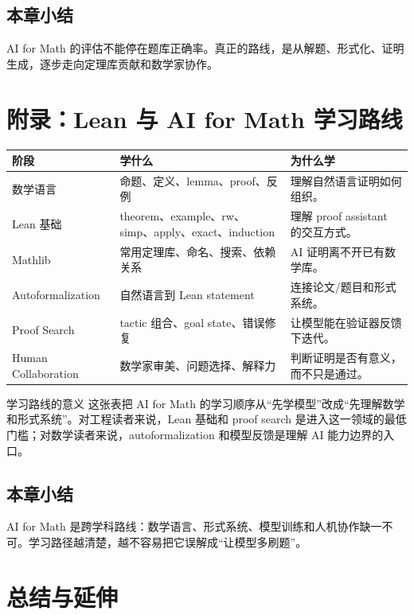 \documentclass[a4paper]{article}
\begin{document}
\subsection{本章小结}

AI for Math 的评估不能停在题库正确率。真正的路线，是从解题、形式化、证明生成，逐步走向定理库贡献和数学家协作。


\section{附录：Lean 与 AI for Math 学习路线}

\noindent\begin{longtable}{p{}p{}p{}}
\toprule
阶段 & 学什么 & 为什么学 \\
\midrule
数学语言 & 命题、定义、lemma、proof、反例 & 理解自然语言证明如何组织。 \\
Lean 基础 & theorem、example、rw、simp、apply、exact、induction & 理解 proof assistant 的交互方式。 \\
Mathlib & 常用定理库、命名、搜索、依赖关系 & AI 证明离不开已有数学库。 \\
Autoformalization & 自然语言到 Lean statement & 连接论文/题目和形式系统。 \\
Proof Search & tactic 组合、goal state、错误修复 & 让模型能在验证器反馈下迭代。 \\
Human Collaboration & 数学家审美、问题选择、解释力 & 判断证明是否有意义，而不只是通过。 \\
\bottomrule
\end{longtable}

\begin{knowledgebox}{学习路线的意义}
这张表把 AI for Math 的学习顺序从“先学模型”改成“先理解数学和形式系统”。对工程读者来说，Lean 基础和 proof search 是进入这一领域的最低门槛；对数学读者来说，autoformalization 和模型反馈是理解 AI 能力边界的入口。
\end{knowledgebox}

\subsection{本章小结}

AI for Math 是跨学科路线：数学语言、形式系统、模型训练和人机协作缺一不可。学习路径越清楚，越不容易把它误解成“让模型多刷题”。

\section{总结与延伸}
\end{document}
